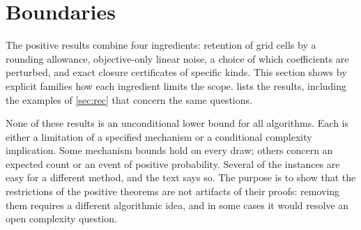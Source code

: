 \section{Boundaries}\label{sec:lim}

The positive results combine four ingredients: retention of grid cells by a
rounding allowance, objective-only linear noise, a choice of which
coefficients are perturbed, and exact closure certificates of specific
kinds. This section shows by explicit families how each ingredient limits
the scope.  lists the results, including the examples
of \cref{sec:rec} that concern the same questions.

None of these results is an unconditional lower bound for all algorithms.
Each is either a limitation of a specified mechanism or a conditional
complexity implication. Some mechanism bounds hold on every draw; others
concern an expected count or an event of positive probability. Several of the instances are
easy for a different method, and the text says so. The purpose is to show
that the restrictions of the positive theorems are not artifacts of their
proofs: removing them requires a different algorithmic idea, and in some
cases it would resolve an open complexity question.

